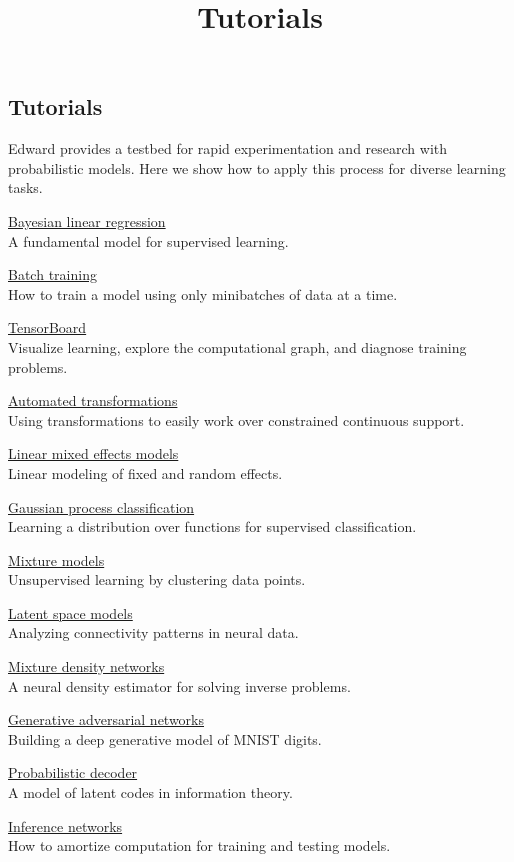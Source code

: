 \title{Tutorials}

\subsection{Tutorials}

Edward provides a testbed for rapid experimentation and research with
probabilistic models. Here we show how to apply this process for
diverse learning tasks.

\href{supervised-regression}{Bayesian linear regression} \\
A fundamental model for supervised learning.

\href{batch-training}{Batch training} \\
How to train a model using only minibatches of data at a time.

\href{tensorboard}{TensorBoard} \\
Visualize learning, explore the computational graph, and diagnose training problems.

\href{automated-transformations}{Automated transformations} \\
Using transformations to easily work over constrained continuous support.

\href{linear-mixed-effects-models}{Linear mixed effects models} \\
Linear modeling of fixed and random effects.

\href{supervised-classification}{Gaussian process classification} \\
Learning a distribution over functions for supervised classification.

\href{unsupervised}{Mixture models} \\
Unsupervised learning by clustering data points.

\href{latent-space-models}{Latent space models} \\
Analyzing connectivity patterns in neural data.

\href{mixture-density-network}{Mixture density networks} \\
A neural density estimator for solving inverse problems.

\href{gan}{Generative adversarial networks} \\
Building a deep generative model of MNIST digits.

\href{decoder}{Probabilistic decoder} \\
A model of latent codes in information theory.

\href{inference-networks}{Inference networks} \\
How to amortize computation for training and testing models.

